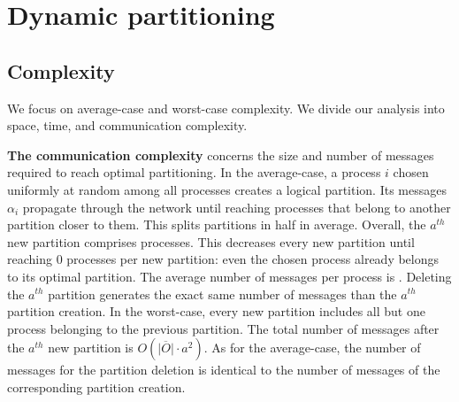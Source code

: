 
\section{Dynamic partitioning}
\label{sec:proposal}


\subsection{Complexity}
\label{subsec:complexity}

We focus on average-case and worst-case complexity. We divide our
analysis into space, time, and communication complexity.

\textbf{The communication complexity} concerns the size and number of
messages required to reach optimal partitioning. In the average-case,
a process $i$ chosen uniformly at random among all processes creates
a logical partition. Its messages $\alpha_i$ propagate through the
network until reaching processes that belong to another partition
closer to them. This splits partitions in half in average. Overall,
the $a^{th}$ new partition comprises
processes. This decreases every new partition until reaching $0$
processes per new partition: even the chosen process already belongs
to its optimal partition. The average number of messages per process
is .  Deleting the $a^{th}$ partition generates the
exact same number of messages than the $a^{th}$ partition
creation.  In the worst-case, every new
partition includes all but one process belonging to the previous
partition. The total number of messages after the $a^{th}$ new
partition is $O(\overline{|O|}\cdot a^2)$. As for the average-case,
the number of messages for the partition deletion is identical to the
number of messages of the corresponding partition creation.

